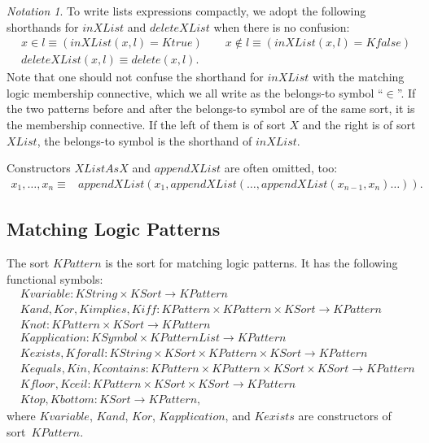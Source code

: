 \documentclass[UTF8]{article}
\newcounter{thmcounter}
\theoremstyle{plain}
\theoremstyle{definition}
\theoremstyle{remark}
\newtheorem{notation}[thmcounter]{Notation}
\newcommand{\Ktrue}{\mathit{Ktrue}}
\newcommand{\Kfalse}{\mathit{Kfalse}}
\newcommand{\KString}{\mathit{KString}}
\newcommand{\Kdelete}{\mathit{delete}}
\newcommand{\KSort}{\mathit{KSort}}
\newcommand{\KSymbol}{\mathit{KSymbol}}
\newcommand{\KPattern}{\mathit{KPattern}}
\newcommand{\KPatternList}{\mathit{KPatternList}}
\newcommand{\Kvariable}{\mathit{Kvariable}}
\newcommand{\Kand}{\mathit{Kand}}
\newcommand{\Kor}{\mathit{Kor}}
\newcommand{\Kimplies}{\mathit{Kimplies}}
\newcommand{\Kiff}{\mathit{Kiff}}
\newcommand{\Knot}{\mathit{Knot}}
\newcommand{\Kapplication}{\mathit{Kapplication}}
\newcommand{\Kexists}{\mathit{Kexists}}
\newcommand{\Kforall}{\mathit{Kforall}}
\newcommand{\Kequals}{\mathit{Kequals}}
\newcommand{\Kin}{\mathit{Kin}}
\newcommand{\Kcontains}{\mathit{Kcontains}}
\newcommand{\Ktop}{\mathit{Ktop}}
\newcommand{\Kbottom}{\mathit{Kbottom}}
\newcommand{\Kfloor}{\mathit{Kfloor}}
\newcommand{\Kceil}{\mathit{Kceil}}
\begin{document}
\begin{notation}
To write lists expressions compactly, we adopt the following shorthands for $\mathit{inXList}$ and $\mathit{deleteXList}$ when there is no confusion:
\begin{align*}
&x \in l \equiv (\mathit{inXList}(x, l) = \Ktrue)
\qquad x \not\in l \equiv (\mathit{inXList}(x, l) = \Kfalse)
\\
&\mathit{deleteXList}(x, l) \equiv \Kdelete(x, l).
\end{align*}
Note that one should not confuse the shorthand for $\mathit{inXList}$ with the 
matching logic membership connective, which we all write as the belongs-to 
symbol ``$\in$''. 
If the two patterns before and after the belongs-to symbol are of the same 
sort, it is the membership connective. 
If the left of them is of sort $\mathit{X}$ and the right is of sort 
$\mathit{XList}$, the belongs-to symbol is the shorthand of $\mathit{inXList}$.

Constructors $\mathit{XListAsX}$ and $\mathit{appendXList}$ are often omitted, too:
\begin{align*}
x_1, \dots, x_n
\equiv &\mathit{appendXList}(x_1, \mathit{appendXList}(\dots, \mathit{appendXList}(x_{n-1}, x_n)\dots)).
\end{align*}
\end{notation}

\subsection{Matching Logic Patterns}

The sort $\KPattern$ is the sort for matching logic patterns.
It has the following functional symbols:
\begin{align*}
&\Kvariable \colon \KString \times \KSort \to 
\KPattern
\\
&\Kand, \Kor, \Kimplies, \Kiff \colon \KPattern \times \KPattern \times \KSort \to \KPattern
\\
&\Knot \colon \KPattern \times \KSort \to \KPattern 
\\
&\Kapplication \colon \KSymbol \times \KPatternList \to \KPattern 
\\
&\Kexists, \Kforall \colon \KString \times \KSort \times \KPattern \times \KSort \to \KPattern 
\\
&\Kequals, \Kin, \Kcontains \colon \KPattern \times 
\KPattern \times \KSort \times \KSort \to \KPattern \\
&\Kfloor, \Kceil \colon \KPattern \times \KSort \times \KSort \to \KPattern\\
&\Ktop, \Kbottom \colon \KSort \to \KPattern,
\end{align*}
where $\Kvariable$, $\Kand$, $\Kor$, $\Kapplication$, and $\Kexists$ are constructors of sort~$\KPattern$. 
\end{document}
